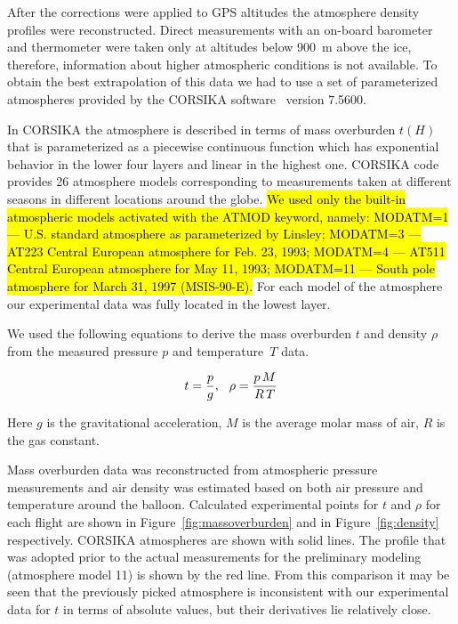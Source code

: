 \documentclass[universe,article,submit,moreauthors,pdftex]{Definitions/mdpi}
\begin{document}
\begin{paracol}{2}
After the corrections were applied to GPS altitudes the atmosphere density profiles were reconstructed. Direct measurements with an on-board barometer and thermometer were taken only at altitudes below 900~m above the ice, therefore, information about higher atmospheric conditions is not available. To obtain the best extrapolation of this data we had to use a set of parameterized atmospheres provided by the CORSIKA software~\cite{hec98} version 7.5600.

In CORSIKA the atmosphere is described in terms of mass overburden $t(H)$ that is parameterized as a piecewise continuous function which has exponential behavior in the lower four layers and linear in the highest one. CORSIKA code provides 26 atmosphere models corresponding to measurements taken at different seasons in different locations around the globe. 
{\hl{We used only the built-in atmospheric models activated with the ATMOD keyword, namely: MODATM=1 --- U.S. standard atmosphere as parameterized by Linsley; MODATM=3 --- AT223 Central European atmosphere for Feb. 23, 1993; MODATM=4 --- AT511 Central European atmosphere for May 11, 1993; MODATM=11 --- South pole atmosphere for March 31, 1997 (MSIS-90-E).}}
For each model of the atmosphere our experimental data was fully located in the lowest layer.

We used the following equations to derive the mass overburden $t$ and density $\rho$ from the measured pressure $p$ and temperature~$T$ data.

\begin{equation}
t     = \frac{p}{g}, \\ \hspace{7pt}
\rho  = \frac{p \, M}{R \, T} \\
\end{equation}

Here $g$ is the gravitational acceleration, $M$ is the average molar mass of air, $R$ is the gas constant.

Mass overburden data was reconstructed from atmospheric pressure measurements and air density was estimated based on both air pressure and temperature around the balloon. Calculated experimental points for $t$ and $\rho$ for each flight are shown in Figure~\ref{fig:massoverburden} and in Figure~\ref{fig:density} respectively. CORSIKA atmospheres are shown with solid lines. The profile that was adopted prior to the actual measurements for the preliminary modeling (atmosphere model 11) is shown by the red line. From this comparison it may be seen that the previously picked atmosphere is inconsistent with our experimental data for $t$ in terms of absolute values, but their derivatives lie relatively close. 




\end{paracol}
\end{document}
